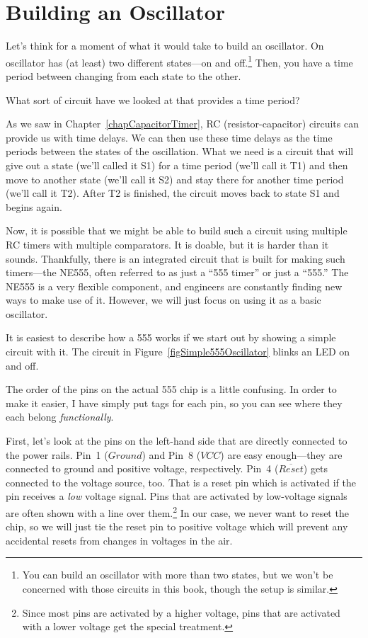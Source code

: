 \section{Building an Oscillator}

Let's think for a moment of what it would take to build an oscillator.
On oscillator has (at least) two different states---on and off.\footnote{You can build an oscillator with more than two states, but we won't be concerned with those circuits in this book, though the setup is similar.}
Then, you have a time period between changing from each state to the other.

What sort of circuit have we looked at that provides a time period?

As we saw in Chapter~\ref{chapCapacitorTimer}, RC (resistor-capacitor) circuits can provide us with time delays.
We can then use these time delays as the time periods between the states of the oscillation.
What we need is a circuit that will give out a state (we'll called it S1) for a time period (we'll call it T1) and then move to another state (we'll call it S2) and stay there for another time period (we'll call it T2). 
After T2 is finished, the circuit moves back to state S1 and begins again.

Now, it is possible that we might be able to build such a circuit using multiple RC timers with multiple comparators.
It is doable, but it is harder than it sounds.
Thankfully, there is an integrated circuit that is built for making such timers---the NE555, often referred to as just a ``555 timer'' or just a ``555.''
The NE555 is a very flexible component, and engineers are constantly finding new ways to make use of it.
However, we will just focus on using it as a basic oscillator.


It is easiest to describe how a 555 works if we start out by showing a simple circuit with it.
The circuit in Figure~\ref{figSimple555Oscillator} blinks an LED on and off.


The order of the pins on the actual 555 chip is a little confusing.
In order to make it easier, I have simply put tags for each pin, so you can see where they each belong \emph{functionally}.

First, let's look at the pins on the left-hand side that are directly connected to the power rails.
Pin~1 ($Ground$) and Pin~8 ($VCC$) are easy enough---they are connected to ground and positive voltage, respectively.
Pin~4 ($\overline{Reset}$) gets connected to the voltage source, too.
That is a reset pin which is activated if the pin receives a \emph{low} voltage signal.
Pins that are activated by low-voltage signals are often shown with a line over them.\footnote{Since most pins are activated by a higher voltage, pins that are activated with a lower voltage get the special treatment.}
In our case, we never want to reset the chip, so we will just tie the reset pin to positive voltage which will prevent any accidental resets from changes in voltages in the air.

